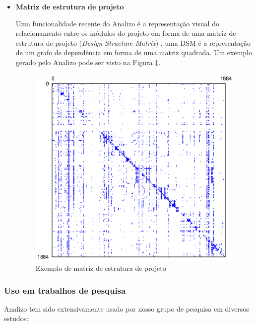 \begin{itemize}
\item {\bf Matriz de estrutura de projeto}

Uma funcionalidade recente do Analizo é a representação visual do
relacionamento entre os módulos do projeto em forma de uma matriz de estrutura
de projeto ({\it Design Structure Matrix}) \cite{Maccormack2006}, uma DSM é a
representação de um grafo de dependência em forma de uma matriz quadrada. Um
exemplo gerado pelo Analizo pode ser visto na Figura \ref{sample-dsm}.

\begin{figure}[h]
\center
\includegraphics[scale=0.3]{imagens/sample-dsm.png}
\caption{Exemplo de matriz de estrutura de projeto}
\label{sample-dsm}
\end{figure}

\end{itemize}

\subsubsection{Uso em trabalhos de pesquisa}
\label{trabalhos-analizo}

Analizo tem sido extensivamente usado por nosso grupo de pesquisa em diversos
estudos:

